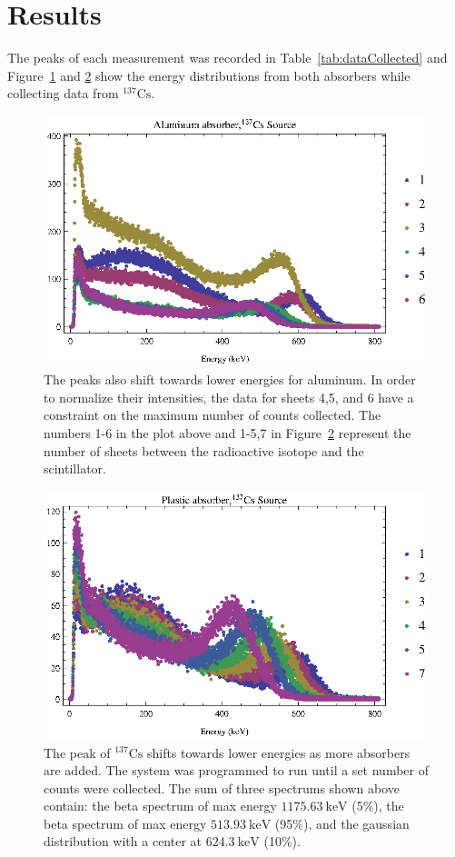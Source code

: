 

\section{Results} %
\label{sec:results}
The peaks of each measurement was recorded in Table~\ref{tab:dataCollected} and Figure~\ref{fig:Figures_aluminumShiftsPlot} and \ref{fig:Figures_plasticShiftsPlot} show the energy distributions from both absorbers while collecting data from $^{137}\text{Cs}$.
\begin{figure}[tbp]
	\centering
		\includegraphics[width=.9\textwidth]{Figures/aluminumShiftsPlot.eps}
	\caption{The peaks also shift towards lower energies for aluminum. In order to normalize their intensities, the data for sheets 4,5, and 6 have a constraint on the maximum number of counts collected.  The numbers 1-6 in the plot above and 1-5,7 in Figure~\ref{fig:Figures_plasticShiftsPlot} represent the number of sheets between the radioactive isotope and the scintillator.}
	\label{fig:Figures_aluminumShiftsPlot}
\end{figure}%
\begin{figure}[tbp]
	\centering
		\includegraphics[width=.9\textwidth]{Figures/plasticShiftsPlot.eps}
	\caption{The peak of $^{137}\text{Cs}$ shifts towards lower energies as more absorbers are added.  The system was programmed to run until a set number of counts were collected.  The sum of three spectrums shown above contain: the beta spectrum of max energy $1175.63~\text{keV}$ (5\%), the beta spectrum of max energy $513.93~\text{keV}$ (95\%), and the gaussian distribution with a center at $624.3~\text{keV}$ (10\%).}
	\label{fig:Figures_plasticShiftsPlot}
\end{figure}%
